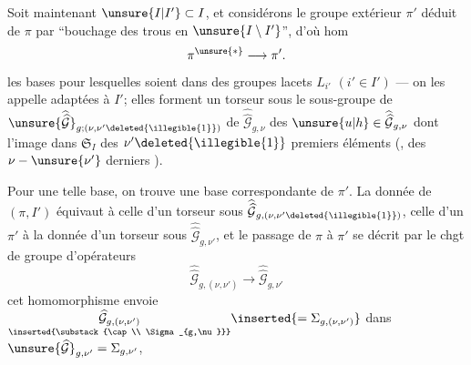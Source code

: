 
Soit maintenant $\unsure{I|I'}\subset I$,  et considérons le groupe extérieur $\pi'$ déduit de $\pi$ par ``bouchage des trous en $\unsure{I\setminus I'}$'', d'où hom
\[
\pi^{\unsure{*}}\longrightarrow\pi'.
\]
  les bases  pour lesquelles    soient dans des  groupes  lacets  $L_{i'}$ $(i'\in I')$ --- on les appelle adaptées à $I'$; elles forment un torseur  sous le sous-groupe de  $\unsure{\widehat{\widehat{\mathcal G}}}_{g;(\nu,\nu'\deleted{\illegible{1}})}$ de $\widehat{\widehat{\mathcal G}}_{g,\nu}$   des $\unsure{u|h}\in\widehat{\widehat{\mathcal G}}_{g,\nu}$ dont l'image dans $\mathfrak S_I$   des $\nu'\deleted{\illegible{1}}$ premiers éléments (, des $\nu-\unsure{\nu'}$ derniers ).


Pour une telle base, on trouve une base correspondante de $\pi'$.  La donnée de $(\pi,I')$ équivaut à celle d'un torseur sous $\widehat{\widehat{\mathcal G}}_{g,(\nu,\nu'\deleted{\illegible{1}})}$, celle d'un $\pi'$ à  la donnée d'un torseur sous $\widehat{\widehat{\mathcal G}}_{g,\nu'}$, et le passage de $\pi$ à $\pi'$ se décrit par le chgt de groupe d'opérateurs
\[
\widehat{\widehat{\mathcal G}}_{g,(\nu,\nu')}\longrightarrow\widehat{\widehat{\mathcal G}}_{g,\nu'}
\]
cet homomorphisme envoie $\underset{\inserted{\substack{\cap\\ \Sigma_{g,\nu}}}}{\widehat{\mathcal G}_{g,(\nu,\nu')}}\inserted{=\Sigma_{g,(\nu,\nu')}}$ dans $\unsure{\widehat{\mathcal G}}_{g,\nu'}=\Sigma_{g,\nu'}$,

